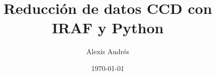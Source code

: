 \documentclass[11pt, letterpaper]{report}
\title{\bf\Huge Reducción de datos CCD con IRAF y Python}
\author{Alexis Andrés}
\date{\today}
\begin{document}
\renewcommand*\thepart{\arabic{part}}
\renewcommand{\partname}{Unidad}
\renewcommand{\chaptername}{Clase}
\renewcommand{\tablename}{Tabla}

\maketitle

\tableofcontents


\end{document}
